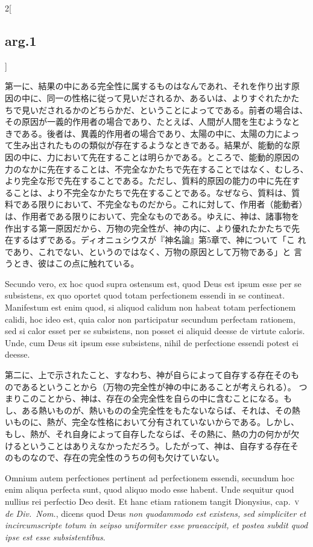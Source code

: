 \documentclass[paper=a4paper,fontsize=10pt,jafontsize=9pt,titlepage]{jlreq}
\begin{document}
\begin{paracol}{2}[\subsection{arg.1}]
\switchcolumn

第一に、結果の中にある完全性に属するものはなんであれ、それを作り出す原
因の中に、同一の性格に従って見いだされるか、あるいは、よりすぐれたかた
ちで見いだされるかのどちらかだ、ということによってである。前者の場合は、
その原因が一義的作用者の場合であり、たとえば、人間が人間を生むようなと
きである。後者は、異義的作用者の場合であり、太陽の中に、太陽の力によっ
て生み出されたものの類似が存在するようなときである。結果が、能動的な原
因の中に、力において先在することは明らかである。ところで、能動的原因の
力のなかに先在することは、不完全なかたちで先在することではなく、むしろ、
より完全な形で先在することである。ただし、質料的原因の能力の中に先在す
ることは、より不完全なかたちで先在することである。なぜなら、質料は、質
料である限りにおいて、不完全なものだから。これに対して、作用者（能動者）
は、作用者である限りにおいて、完全なものである。ゆえに、神は、諸事物を
作出する第一原因だから、万物の完全性が、神の内に、より優れたかたちで先
在するはずである。ディオニュシウスが『神名論』第5章で、神について「こ
れであり、これでない、というのではなく、万物の原因として万物である」と
言うとき、彼はこの点に触れている。

\switchcolumn*

Secundo vero, ex hoc quod supra ostensum est, quod Deus est ipsum esse
per se subsistens, ex quo oportet quod totam perfectionem essendi in
se contineat. Manifestum est enim quod, si aliquod calidum non habeat
totam perfectionem calidi, hoc ideo est, quia calor non participatur
secundum perfectam rationem, sed si calor esset per se subsistens, non
posset ei aliquid deesse de virtute caloris. Unde, cum Deus sit ipsum
esse subsistens, nihil de perfectione essendi potest ei deesse.

\switchcolumn

第二に、上で示されたこと、すなわち、神が自らによって自存する存在そのも
のであるということから（万物の完全性が神の中にあることが考えられる）。
つまりこのことから、神は、存在の全完全性を自らの中に含むことになる。も
し、ある熱いものが、熱いものの全完全性をもたないならば、それは、その熱
いものに、熱が、完全な性格において分有されていないからである。しかし、
もし、熱が、それ自身によって自存したならば、その熱に、熱の力の何かが欠
けるということはありえなかっただろう。したがって、神は、自存する存在そ
のものなので、存在の完全性のうちの何も欠けていない。

\switchcolumn*

Omnium autem perfectiones pertinent ad perfectionem essendi, secundum
hoc enim aliqua perfecta sunt, quod aliquo modo esse habent. Unde
sequitur quod nullius rei perfectio Deo desit. Et hanc etiam rationem
tangit Dionysius, cap.~{\scshape v} {\itshape de Div.~Nom.}, dicens
quod Deus {\itshape non quodammodo est existens, sed simpliciter et
incircumscripte totum in seipso uniformiter esse praeaccipit, et
postea subdit quod ipse est esse subsistentibus}.


\end{paracol}
\end{document}

